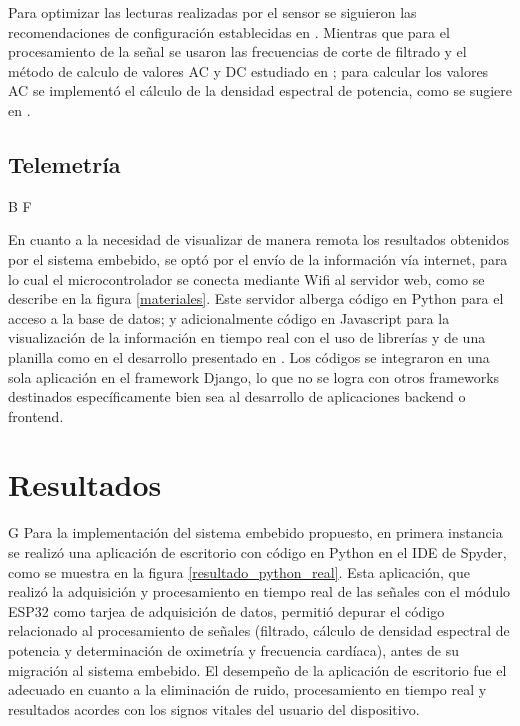 \documentclass[journal]{IEEEtran}
\begin{document}
Para optimizar las lecturas realizadas por el sensor se siguieron las recomendaciones de configuración establecidas en \cite{E_Recomended_configurations_MAX30102_maxim} \cite{E_SNR_MAX30102}. Mientras que para el procesamiento de la señal se usaron las frecuencias de corte de filtrado y el método de calculo de valores AC y DC estudiado en \cite{E_FFT_Spo2}; para calcular los valores AC se implementó el cálculo de la densidad espectral de potencia, como se sugiere en \cite{E_psd_ppg}.


\subsection{Telemetría}

{\color{blue}B F}


En cuanto a la necesidad de visualizar de manera remota los resultados obtenidos por el sistema embebido, se optó por el envío de la información vía internet, para lo cual el microcontrolador se conecta mediante Wifi al servidor web, como se describe en la figura \ref{materiales}. Este servidor  alberga código en Python para el acceso a la base de datos; y adicionalmente código en Javascript para la visualización de la información en tiempo real con el uso de librerías y de una planilla como en el desarrollo presentado en \cite{F_iot_spo2_wrist}. Los códigos se integraron en una sola aplicación en el framework Django, lo que no se logra con otros frameworks destinados específicamente bien sea al desarrollo de aplicaciones backend o frontend.

 

\section{Resultados}
{\color{blue}G}
Para la implementación del sistema embebido propuesto, en primera instancia se realizó una aplicación de escritorio con código en Python en el IDE de Spyder, como se muestra en la figura \ref{resultado_python_real}. Esta aplicación, que realizó la adquisición y procesamiento en tiempo real de las señales con el módulo ESP32 como tarjea de adquisición de datos, permitió depurar el código relacionado al procesamiento de señales (filtrado, cálculo de densidad espectral de potencia y determinación de oximetría y frecuencia cardíaca), antes de su migración al sistema embebido. El desempeño de la aplicación de escritorio fue el adecuado en cuanto a la eliminación de ruido, procesamiento en tiempo real y resultados acordes con los signos vitales del usuario del dispositivo.
\end{document}
